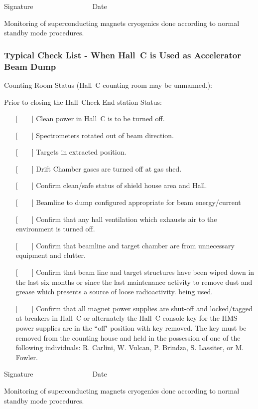 \vspace{0.5in}
\hspace*{\fill}{\underline{~~~~~~~~~~~~~~~~~~~~~~~~~~~~~~~~~}}
\newline\hspace*{\fill} {Signature~~~~~~~~~~~~~~~~~Date}


Monitoring of superconducting magnets cryogenics done according to 
normal standby mode procedures.

\newpage
\subsubsection{Typical Check List -  When Hall~C is Used as Accelerator Beam Dump}

\noindent Counting Room Status (Hall~C counting room may be unmanned.):
\vspace{\baselineskip}

\noindent Prior to closing the Hall~Check End station Status:
\vspace{\baselineskip}

\begin{itemize}
\item[{[~~~~]}]
Clean power in Hall~C is to be turned off.
\item[{[~~~~]}]
Spectrometers rotated out of beam direction.
\item[{[~~~~]}]
Targets in extracted position.
\item[{[~~~~]}]
Drift Chamber gases are turned off at gas shed.
\item[{[~~~~]}]
Confirm clean/safe status of shield house area and Hall.
\item[{[~~~~]}]
Beamline to dump configured appropriate for beam energy/current 
\item[{[~~~~]}] 
Confirm that any hall ventilation which exhausts air to the environment is turned off.
\item[{[~~~~]}]
 Confirm that beamline and target chamber are from unnecessary equipment and clutter.
\item[{[~~~~]}] 
Confirm that beam line and target structures have been wiped down in the last six months or since the last maintenance activity to remove dust and grease which presents a source of loose radioactivity.
being used.
\item[{[~~~~]}]  Confirm that all magnet power supplies are shut-off and locked/tagged at breakers in 
Hall~C or alternately the Hall~C console key for the HMS power supplies are in 
the ``off" position with key removed. The key must be removed from the counting 
house and held in the possession of one of the following individuals: R. 
Carlini, W. Vulcan, P. Brindza, S. Lassiter, or M. Fowler.
\end{itemize}

\vspace{0.5in}
\hspace*{\fill}{\underline{~~~~~~~~~~~~~~~~~~~~~~~~~~~~~~~~~}}
\newline\hspace*{\fill} {Signature~~~~~~~~~~~~~~~~~Date}


Monitoring of superconducting magnets cryogenics done according to 
normal standby mode procedures.

